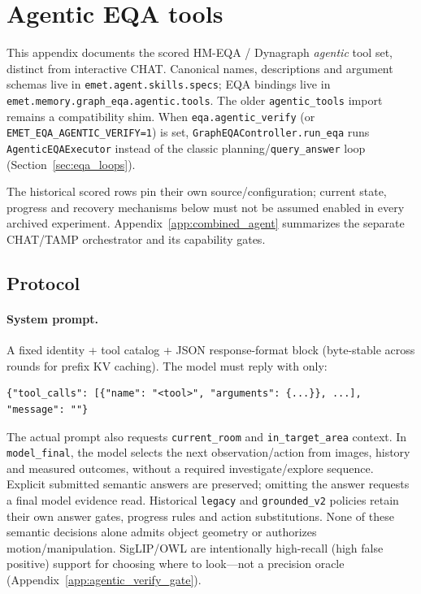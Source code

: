 \section{Agentic EQA tools}
\label{app:agentic_tools}

This appendix documents the scored HM-EQA / Dynagraph \emph{agentic} tool set,
distinct from interactive CHAT. Canonical names, descriptions and argument schemas
live in \texttt{emet.agent.skills.specs}; EQA bindings live in
\texttt{emet.memory.graph\_eqa.agentic.tools}. The older
\texttt{agentic\_tools} import remains a compatibility shim.
When \texttt{eqa.agentic\_verify} (or \texttt{EMET\_EQA\_AGENTIC\_VERIFY=1}) is set, \texttt{GraphEQAController.run\_eqa} runs \texttt{AgenticEQAExecutor} instead of the classic planning/\texttt{query\_answer} loop (Section~\ref{sec:eqa_loops}).

The historical scored rows pin their own source/configuration; current state,
progress and recovery mechanisms below must not be assumed enabled in every
archived experiment. Appendix~\ref{app:combined_agent} summarizes the separate
CHAT/TAMP orchestrator and its capability gates.

\subsection{Protocol}

\paragraph{System prompt.}
A fixed identity + tool catalog + JSON response-format block (byte-stable across rounds for prefix KV caching).
The model must reply with only:
\begin{verbatim}
{"tool_calls": [{"name": "<tool>", "arguments": {...}}, ...], "message": ""}
\end{verbatim}
The actual prompt also requests \texttt{current\_room} and
\texttt{in\_target\_area} context. In \texttt{model\_final}, the model selects
the next observation/action from images, history and measured outcomes, without
a required investigate/explore sequence. Explicit submitted semantic answers are
preserved; omitting the answer requests a final model evidence read. Historical
\texttt{legacy} and \texttt{grounded\_v2} policies retain their own answer gates,
progress rules and action substitutions. None of these semantic decisions alone
admits object geometry or authorizes motion/manipulation.
SigLIP/OWL are intentionally high-recall (high false positive) support for choosing where to look---not a precision oracle (Appendix~\ref{app:agentic_verify_gate}).

